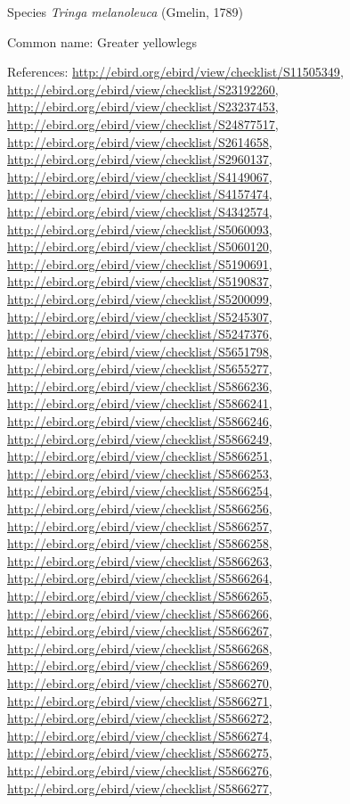 \documentclass[9pt, article]{memoir}
\begin{document}
\begin{multicols}{2}
\vspace{6pt}\noindent\hspace{36pt}Species \textit{Tringa melanoleuca} (Gmelin, 1789)


Common name: Greater yellowlegs

References: 
\url{http://ebird.org/ebird/view/checklist/S11505349}, 
\url{http://ebird.org/ebird/view/checklist/S23192260}, 
\url{http://ebird.org/ebird/view/checklist/S23237453}, 
\url{http://ebird.org/ebird/view/checklist/S24877517}, 
\url{http://ebird.org/ebird/view/checklist/S2614658}, 
\url{http://ebird.org/ebird/view/checklist/S2960137}, 
\url{http://ebird.org/ebird/view/checklist/S4149067}, 
\url{http://ebird.org/ebird/view/checklist/S4157474}, 
\url{http://ebird.org/ebird/view/checklist/S4342574}, 
\url{http://ebird.org/ebird/view/checklist/S5060093}, 
\url{http://ebird.org/ebird/view/checklist/S5060120}, 
\url{http://ebird.org/ebird/view/checklist/S5190691}, 
\url{http://ebird.org/ebird/view/checklist/S5190837}, 
\url{http://ebird.org/ebird/view/checklist/S5200099}, 
\url{http://ebird.org/ebird/view/checklist/S5245307}, 
\url{http://ebird.org/ebird/view/checklist/S5247376}, 
\url{http://ebird.org/ebird/view/checklist/S5651798}, 
\url{http://ebird.org/ebird/view/checklist/S5655277}, 
\url{http://ebird.org/ebird/view/checklist/S5866236}, 
\url{http://ebird.org/ebird/view/checklist/S5866241}, 
\url{http://ebird.org/ebird/view/checklist/S5866246}, 
\url{http://ebird.org/ebird/view/checklist/S5866249}, 
\url{http://ebird.org/ebird/view/checklist/S5866251}, 
\url{http://ebird.org/ebird/view/checklist/S5866253}, 
\url{http://ebird.org/ebird/view/checklist/S5866254}, 
\url{http://ebird.org/ebird/view/checklist/S5866256}, 
\url{http://ebird.org/ebird/view/checklist/S5866257}, 
\url{http://ebird.org/ebird/view/checklist/S5866258}, 
\url{http://ebird.org/ebird/view/checklist/S5866263}, 
\url{http://ebird.org/ebird/view/checklist/S5866264}, 
\url{http://ebird.org/ebird/view/checklist/S5866265}, 
\url{http://ebird.org/ebird/view/checklist/S5866266}, 
\url{http://ebird.org/ebird/view/checklist/S5866267}, 
\url{http://ebird.org/ebird/view/checklist/S5866268}, 
\url{http://ebird.org/ebird/view/checklist/S5866269}, 
\url{http://ebird.org/ebird/view/checklist/S5866270}, 
\url{http://ebird.org/ebird/view/checklist/S5866271}, 
\url{http://ebird.org/ebird/view/checklist/S5866272}, 
\url{http://ebird.org/ebird/view/checklist/S5866274}, 
\url{http://ebird.org/ebird/view/checklist/S5866275}, 
\url{http://ebird.org/ebird/view/checklist/S5866276}, 
\url{http://ebird.org/ebird/view/checklist/S5866277}, 

\end{multicols}
\end{document}
